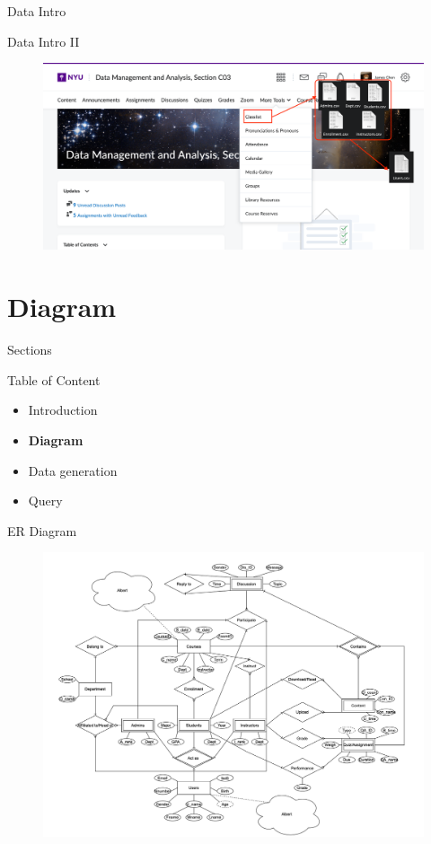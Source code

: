 \documentclass[a4paper,10pt]{beamer}
\begin{document}
\begin{frame}{Data Intro}
\begin{block}{Data Intro II}
\begin{figure}[H]
    \includegraphics[width=\textwidth]{Intro3.png}
\end{figure}
\end{block}
\end{frame}

\section{Diagram}
\begin{frame}{Sections}
\begin{block}{Table of Content}
\begin{itemize}
    \item Introduction
    \item \textbf{Diagram}
    \item Data generation
    \item Query
\end{itemize}
\end{block}
\end{frame}

\begin{frame}{ER Diagram}
\begin{figure}[H]
    \includegraphics[width=\textwidth]{ER.png}
\end{figure}
\end{frame}
\end{document}
